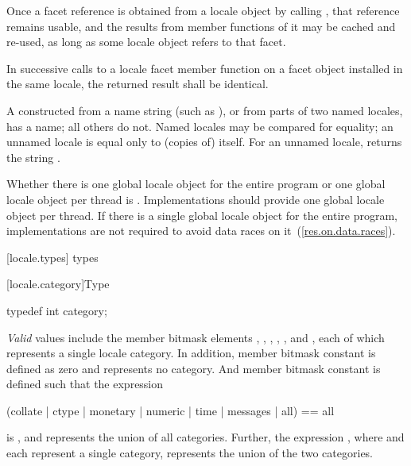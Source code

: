 \pnum
Once a facet reference is obtained from a locale object by calling
,
that reference remains usable, and the results from member functions
of it may be cached and re-used, as long as some locale object refers
to that facet.

\pnum
In successive calls to a locale facet member function on a facet object
installed in the same locale, the returned result shall be identical.

\pnum
A
constructed from a name string (such as ), or from parts of
two named locales, has a name; all others do not.
Named locales may be compared for equality; an unnamed locale is equal
only to (copies of) itself.
For an unnamed locale,
returns the string
.

\pnum
Whether there is one global locale object for the entire program or one global locale
object per thread is .
Implementations should provide one global locale object per
thread. If there is a single global locale object for the entire program,
implementations are not required to avoid data races on it~(\ref{res.on.data.races}).

[locale.types]{ types}


[locale.category]{Type }

%
%
\begin{itemdecl}
typedef int category;
\end{itemdecl}

\pnum
\textit{Valid}
values include the
member bitmask elements
,
,
,
,
,
and
,
each of which represents a single locale category.
In addition,
member bitmask constant
is defined as zero and represents no category. And
member bitmask constant
is defined such that the expression

\begin{codeblock}
(collate | ctype | monetary | numeric | time | messages | all) == all
\end{codeblock}

is
,
and represents the union of all categories.
Further, the expression
,
where
and
each represent a single category, represents the union of the two categories.

